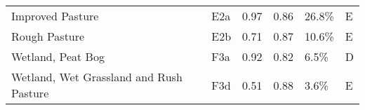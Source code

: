 \begin{tabular}{llllll}
                          Improved Pasture &           E2a &                 0.97 &               0.86 &                    26.8\% &                   E \\
                             Rough Pasture &           E2b &                 0.71 &               0.87 &                    10.6\% &                   E \\
                         Wetland, Peat Bog &           F3a &                 0.92 &               0.82 &                     6.5\% &                   D \\
   Wetland, Wet Grassland and Rush Pasture &           F3d &                 0.51 &               0.88 &                     3.6\% &                   E \\
\bottomrule
\end{tabular}
